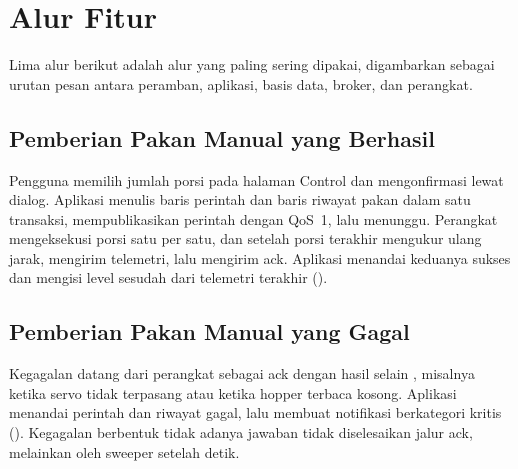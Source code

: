 
\section{Alur Fitur}

Lima alur berikut adalah alur yang paling sering dipakai, digambarkan sebagai
urutan pesan antara peramban, aplikasi, basis data, broker, dan perangkat.

\subsection{Pemberian Pakan Manual yang Berhasil}

Pengguna memilih jumlah porsi pada halaman Control dan mengonfirmasi lewat dialog.
Aplikasi menulis baris perintah dan baris riwayat pakan dalam satu transaksi,
mempublikasikan perintah dengan QoS~1, lalu menunggu. Perangkat mengeksekusi porsi
satu per satu, dan setelah porsi terakhir mengukur ulang jarak, mengirim telemetri,
lalu mengirim ack. Aplikasi menandai keduanya sukses dan mengisi level sesudah dari
telemetri terakhir ().


\subsection{Pemberian Pakan Manual yang Gagal}

Kegagalan datang dari perangkat sebagai ack dengan hasil selain , misalnya
 ketika servo tidak terpasang atau  ketika
hopper terbaca kosong. Aplikasi menandai perintah dan riwayat gagal, lalu membuat
notifikasi  berkategori kritis
(). Kegagalan berbentuk tidak adanya jawaban
tidak diselesaikan jalur ack, melainkan oleh sweeper setelah \CmdTimeoutS{} detik.


